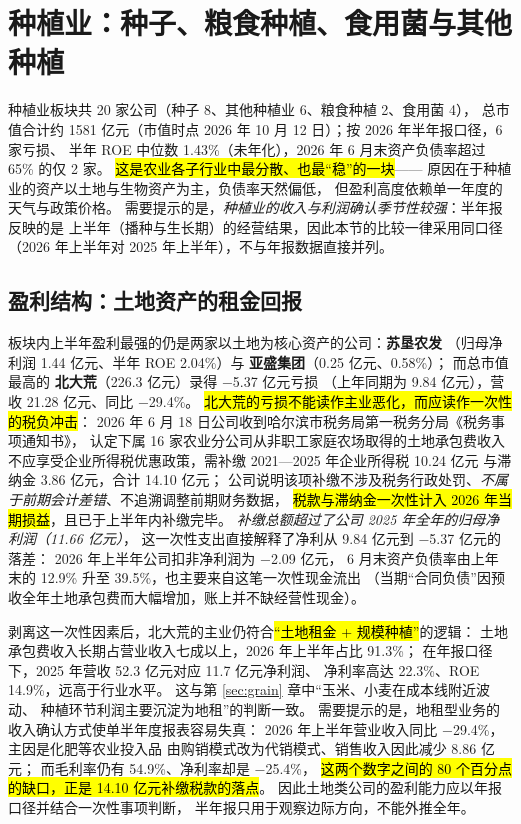 \section{种植业：种子、粮食种植、食用菌与其他种植}
\label{sec:planting}

种植业板块共 \num{20} 家公司（种子 \num{8}、其他种植业 \num{6}、粮食种植 \num{2}、食用菌 \num{4}），
总市值合计约 \num{1581} 亿元（市值时点 2026 年 10 月 12 日）；按 2026 年半年报口径，\num{6} 家亏损、
半年 ROE 中位数 \num{1.43}\%（未年化），2026 年 6 月末资产负债率超过 \num{65}\% 的仅 \num{2} 家。
\hl{这是农业各子行业中最分散、也最“稳”的一块}——
原因在于种植业的资产以土地与生物资产为主，负债率天然偏低，
但盈利高度依赖单一年度的天气与政策价格。
需要提示的是，\emph{种植业的收入与利润确认季节性较强}：半年报反映的是
上半年（播种与生长期）的经营结果，因此本节的比较一律采用同口径
（2026 年上半年对 2025 年上半年），不与年报数据直接并列。



\subsection{盈利结构：土地资产的租金回报}
\label{sec:planting-earnings}

板块内上半年盈利最强的仍是两家以土地为核心资产的公司：\textbf{苏垦农发}
（归母净利润 \num{1.44} 亿元、半年 ROE \num{2.04}\%）与
\textbf{亚盛集团}（\num{0.25} 亿元、\num{0.58}\%）；
而总市值最高的 \textbf{北大荒}（\num{226.3} 亿元）录得 \num{-5.37} 亿元亏损
（上年同期为 \num{+9.84} 亿元），营收 \num{21.28} 亿元、同比 \num{-29.4}\%。
\hl{北大荒的亏损不能读作主业恶化，而应读作一次性的税负冲击}：
2026 年 6 月 18 日公司收到哈尔滨市税务局第一税务分局《税务事项通知书》，
认定下属 \num{16} 家农业分公司从非职工家庭农场取得的土地承包费收入
不应享受企业所得税优惠政策，需补缴 2021---2025 年企业所得税 \num{10.24} 亿元
与滞纳金 \num{3.86} 亿元，合计 \num{14.10} 亿元；
公司说明该项补缴不涉及税务行政处罚、\emph{不属于前期会计差错}、不追溯调整前期财务数据，
\hl{税款与滞纳金一次性计入 2026 年当期损益}，且已于上半年内补缴完毕。
\emph{补缴总额超过了公司 2025 年全年的归母净利润（\num{11.66} 亿元）}，
这一次性支出直接解释了净利从 \num{+9.84} 亿元到 \num{-5.37} 亿元的落差：
2026 年上半年公司扣非净利润为 \num{-2.09} 亿元，
6 月末资产负债率由上年末的 \num{12.9}\% 升至 \num{39.5}\%，也主要来自这笔一次性现金流出
（当期“合同负债”因预收全年土地承包费而大幅增加，账上并不缺经营性现金）。

剥离这一次性因素后，北大荒的主业仍符合\hl{“土地租金 + 规模种植”}的逻辑：
土地承包费收入长期占营业收入七成以上，2026 年上半年占比 \num{91.3}\%；
在年报口径下，2025 年营收 \num{52.3} 亿元对应 \num{11.7} 亿元净利润、
净利率高达 \num{22.3}\%、ROE \num{14.9}\%，远高于行业水平。
这与第 \ref{sec:grain} 章中“玉米、小麦在成本线附近波动、
种植环节利润主要沉淀为地租”的判断一致。
需要提示的是，地租型业务的收入确认方式使单半年度报表容易失真：
2026 年上半年营业收入同比 \num{-29.4}\%，主因是化肥等农业投入品
由购销模式改为代销模式、销售收入因此减少 \num{8.86} 亿元；
而毛利率仍有 \num{54.9}\%、净利率却是 \num{-25.4}\%，
\hl{这两个数字之间的 \num{80} 个百分点的缺口，正是 \num{14.10} 亿元补缴税款的落点}。
因此土地类公司的盈利能力应以年报口径并结合一次性事项判断，
半年报只用于观察边际方向，不能外推全年。

